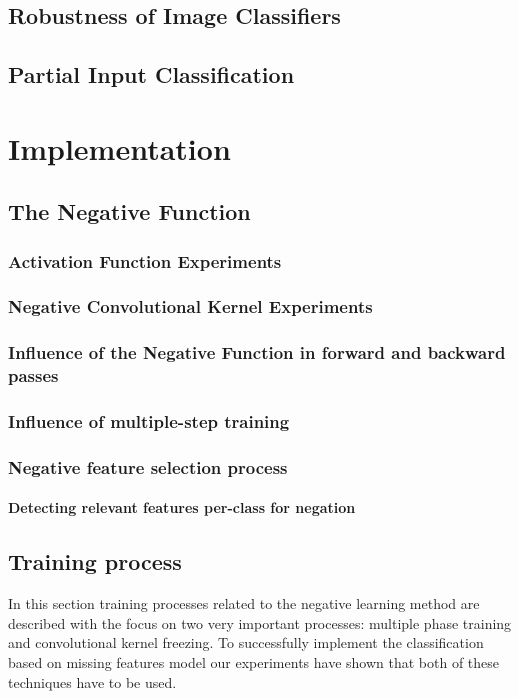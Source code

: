 \documentclass[b5paper]{book}
\begin{document}
\section{Robustness of Image Classifiers}
\section{Partial Input Classification}

\chapter{Implementation}

\section{The Negative Function}
\subsection{Activation Function Experiments}
\subsection{Negative Convolutional Kernel Experiments}
\subsection{Influence of the Negative Function in forward and backward passes}
\subsection{Influence of multiple-step training}
\subsection{Negative feature selection process}
\subsubsection{Detecting relevant features per-class for negation}

\section{Training process}

In this section training processes related to the negative learning method are described with the focus on two very important processes: multiple phase training and convolutional kernel freezing. To successfully implement the classification based on missing features model our experiments have shown that both of these techniques have to be used.
\end{document}
